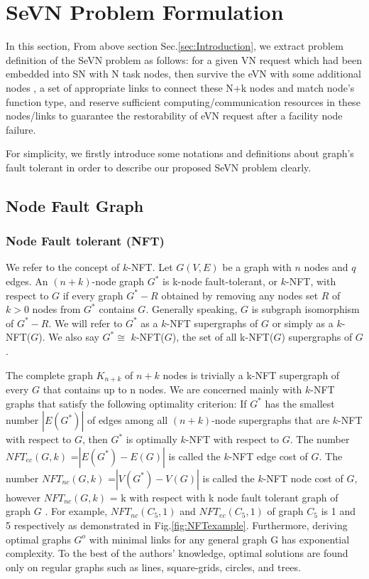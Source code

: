 
\section{SeVN Problem Formulation}
\label{sec:ProblemFormulation}
In this section, From above section Sec.\ref{sec:Introduction}, we extract problem definition of the SeVN problem as follows: for a given VN request which had been embedded into SN with N task nodes, then survive the eVN with
some additional nodes , a set of appropriate links to connect these N+k nodes and match node's function type, and reserve sufficient computing/communication resources in these nodes/links to guarantee the restorability of eVN request after a facility node failure.

For simplicity, we firstly introduce some notations and definitions about graph's fault tolerant in order to describe our proposed SeVN problem clearly.

\subsection{Node Fault Graph}
\subsubsection{Node Fault tolerant (NFT)}
We refer to the concept of $k$-NFT\cite{harary1996node}. Let $G(V,E)$ be a graph with $n$ nodes and $q$ edges. An $(n+k)$-node graph $G^*$ is k-node fault-tolerant, or $k$-NFT, with respect to $G$ if every graph $G^*-R$ obtained by removing any nodes set $R$ of $k>0$ nodes from $G^*$ contains $G$. Generally speaking, $G$ is subgraph isomorphism of $G^*-R$. We will refer to $G^*$ as a $k$-NFT supergraphs of $G$ or simply as a $k$-NFT($G$). We also say $G^*\cong$ $k$-NFT($G$), the set of all k-NFT($G$) supergraphs of $G$.

The complete graph $K_{n+k}$ of $n + k$ nodes is trivially a k-NFT supergraph of every $G$ that contains up to n nodes. We are concerned mainly with $k$-NFT graphs that satisfy the following optimality criterion: If $G^*$ has the smallest number $|E(G^*)|$ of edges among all $(n + k)$-node supergraphs that are $k$-NFT with respect to $G$, then $G^*$ is optimally $k$-NFT with respect to $G$. The number $NFT_{ec}$$(G,k)$ =$|E(G^*)-E(G)|$ is called the $k$-NFT edge cost of $G$. The number $NFT_{nc}$$(G,k)$ =$|V(G^*)-V(G)|$ is called the $k$-NFT node cost of $G$, however $NFT_{nc}$$(G,k)$ = k with respect with k node fault tolerant graph of graph $G$ . For example, $NFT_{nc}$$(C_5,1)$ and $NFT_{ec}$$(C_5,1)$ of graph $C_5$ is 1 and 5 respectively as demonstrated in Fig.\ref{fig:NFTexample}. Furthermore, deriving optimal graphs $G^o$ with minimal links for any general graph G has exponential complexity. To the best of the authors’ knowledge, optimal solutions are found only on regular graphs such as lines, square-grids, circles, and trees.

